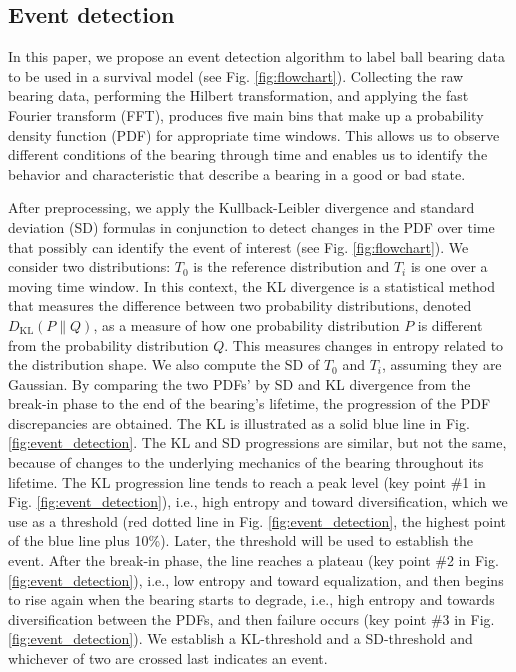 \documentclass[letterpaper]{article} %
\begin{document}
\subsection{Event detection}

In this paper, we propose an event detection algorithm to label ball bearing data to be used in a survival model (see Fig. \ref{fig:flowchart}). Collecting the raw bearing data, performing the Hilbert transformation, and applying the fast Fourier transform (FFT), produces five main bins that make up a probability density function (PDF) for appropriate time windows. This allows us to observe different conditions of the bearing through time and enables us to identify the behavior and characteristic that describe a bearing in a good or bad state.

After preprocessing, we apply the Kullback-Leibler divergence and standard deviation (SD) formulas in conjunction to detect changes in the PDF over time that possibly can identify the event of interest (see Fig. \ref{fig:flowchart}).  We consider two distributions: $T_{0}$ is the reference distribution and $T_{i}$ is one over a moving time window. In this context, the KL divergence is a statistical method that measures the difference between two probability distributions, denoted $D_{\mathrm{KL}}(P \| Q)$, as a measure of how one probability distribution $P$ is different from the probability distribution $Q$. This measures changes in entropy related to the distribution shape. We also compute the SD of $T_{0}$ and $T_{i}$, assuming they are Gaussian. By comparing the two PDFs' by SD and KL divergence from the break-in phase to the end of the bearing's lifetime, the progression of the PDF discrepancies are obtained. The KL is illustrated as a solid blue line in Fig. \ref{fig:event_detection}. The KL and SD progressions are similar, but not the same, because of changes to the underlying mechanics of the bearing throughout its lifetime. The KL progression line tends to reach a peak level (key point \#1 in Fig. \ref{fig:event_detection}), i.e., high entropy and toward diversification, which we use as a threshold (red dotted line in Fig. \ref{fig:event_detection}, the highest point of the blue line plus 10\%). Later, the threshold will be used to establish the event. After the break-in phase, the line reaches a plateau (key point \#2 in Fig. \ref{fig:event_detection}), i.e., low entropy and toward equalization, and then begins to rise again when the bearing starts to degrade, i.e., high entropy and towards diversification between the PDFs, and then failure occurs (key point \#3 in Fig. \ref{fig:event_detection}). We establish a KL-threshold and a SD-threshold and whichever of two are crossed last indicates an event.
\end{document}
